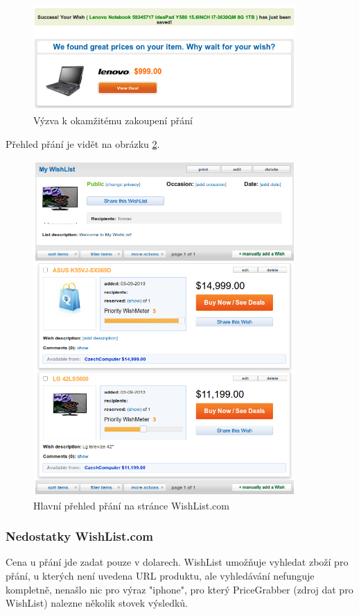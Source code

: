 \begin{figure}[htb]
\begin{center}
\includegraphics[width=100mm]{./pictures/wishlist-buynow.png}
\caption{Výzva k okamžitému zakoupení přání}
\label{fig:wishlist-buynow}
\end{center}
\end{figure}

Přehled přání je vidět na obrázku \ref{fig:wishlist-wishlist}.

\begin{figure}[htb]
\begin{center}
\includegraphics[width=100mm]{./pictures/wishlist-wishlist.png}
\caption{Hlavní přehled přání na stránce WishList.com}
\label{fig:wishlist-wishlist}
\end{center}
\end{figure}

\subsubsection{Nedostatky WishList.com}
Cena u přání jde zadat pouze v dolarech. WishList umožňuje vyhledat zboží pro přání, u kterých není uvedena URL produktu, ale vyhledávání nefunguje kompletně, nenašlo nic pro výraz "iphone", pro který PriceGrabber (zdroj dat pro WishList) nalezne několik stovek výsledků.

